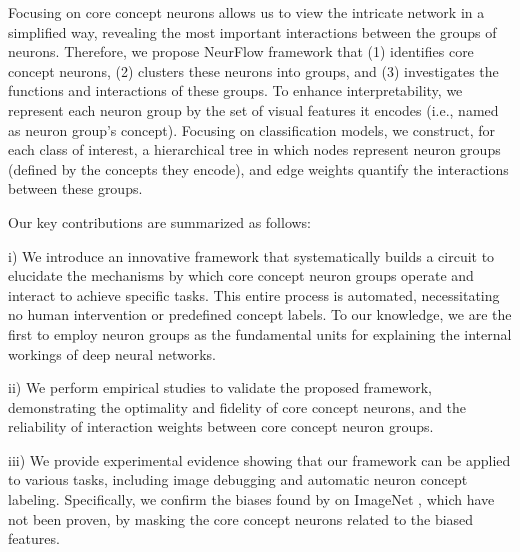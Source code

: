 Focusing on core concept neurons allows us to view the intricate network in a simplified way, revealing the most important interactions between the groups of neurons. 
Therefore, we propose NeurFlow framework that (1) identifies core concept neurons, (2) clusters these neurons into groups, and (3) investigates the functions and interactions of these groups. To enhance interpretability, we represent each  neuron group by the set of visual features it encodes (i.e., named as neuron group’s concept). Focusing on classification models, we construct, for each class of interest, %
a hierarchical tree in which nodes represent neuron groups (defined by the concepts they encode), and edge weights quantify the interactions between these groups.

Our key contributions are summarized as follows:

\noindent i) We introduce an innovative framework that systematically builds a circuit to elucidate the mechanisms by which core concept neuron groups operate and interact to achieve specific tasks. This entire process is automated, necessitating no human intervention or predefined concept labels. To our knowledge, we are the first to employ neuron groups as the fundamental units for explaining the internal workings of deep neural networks.

\noindent ii) We perform empirical studies to validate the proposed framework, demonstrating the optimality and fidelity of core concept neurons, and the reliability of interaction weights between core concept neuron groups. 

\noindent iii) We provide experimental evidence showing that our framework can be applied to various tasks, including image debugging and automatic neuron concept labeling. Specifically, we confirm the biases found by \citet{Debias} on ImageNet \citep{Imagenet}, which have not been proven, by masking the core concept neurons related to the biased features.





